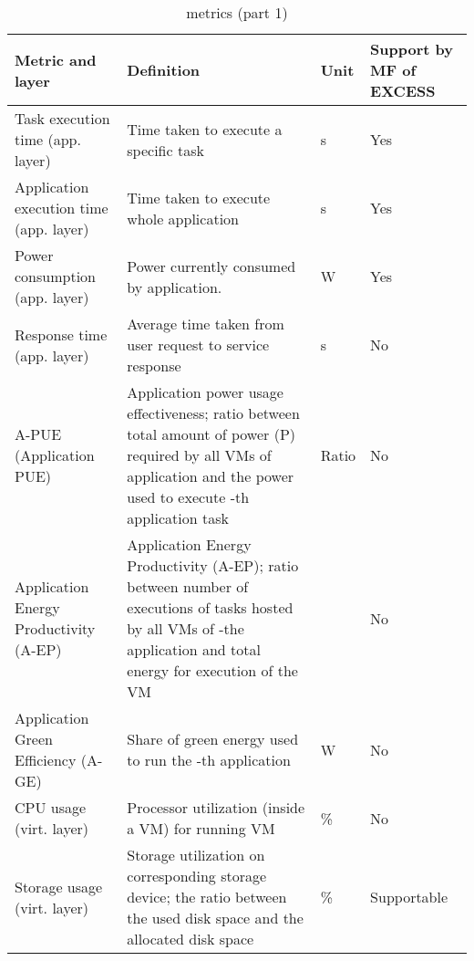 \documentclass[10pt,letterpaper]{IEEEtran}
\begin{document}
\begin{table}
\caption{\ECO metrics (part 1)}
\label{e2c1}
\small
\begin{center}
\begin{tabular}{|m{1.5cm}|m{4cm}|m{0.5cm}|m{1.3cm}|}
\hline
Metric and layer & Definition & Unit & Support by MF of EXCESS \\ \hline \hline
Task execution time (app. layer) & Time taken to execute a specific task & s & Yes \\ \hline
Application execution time (app. layer) & Time taken to execute whole application & s & Yes\\ \hline
Power consumption (app. layer) & Power currently consumed by application.
& W & Yes \\ \hline
Response time (app. layer) & Average time taken from user request to service response
& s & No\\ \hline
A-PUE (Application PUE) & Application power usage effectiveness; ratio between
total amount of power (P) required by all VMs of application  and the power used to execute -th application task & Ratio & No \\ \hline
Application Energy Productivity (A-EP) & Application Energy Productivity (A-EP);
ratio between number of executions of tasks hosted by all VMs of -the
application and total energy for execution of the VM &  & No \\ \hline
Application Green Efficiency (A-GE) & Share of green energy used to run the -th application
& W & No \\ \hline
CPU usage (virt. layer) & Processor utilization (inside a VM) for running VM
& \% & No \\ \hline
Storage usage (virt. layer) & Storage utilization on corresponding storage device; the ratio between
the used disk space and the allocated disk space & \% & Supportable \\ \hline
\end{tabular}
\end{center}
\end{table}
\end{document}
